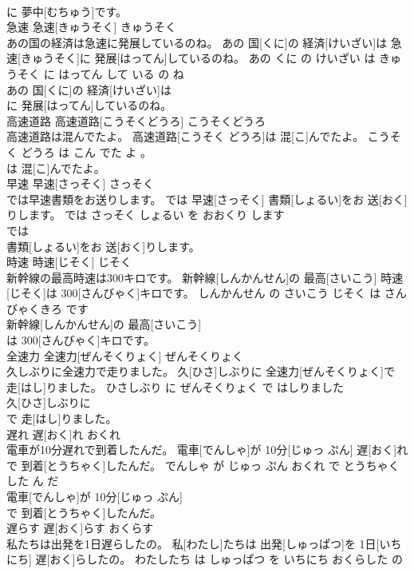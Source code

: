 \documentclass[8pt]{extreport}
\begin{document}
\begin{CJK}{UTF8}{min}
\\	に 夢中[むちゅう]です。			
\\	急速	急速[きゅうそく]	きゅうそく	
\\	あの国の経済は急速に発展しているのね。	あの 国[くに]の 経済[けいざい]は 急速[きゅうそく]に 発展[はってん]しているのね。	あの くに の けいざい は きゅうそく に はってん して いる の ね	
\\	あの 国[くに]の 経済[けいざい]は
\\	に 発展[はってん]しているのね。			
\\	高速道路	高速道路[こうそくどうろ]	こうそくどうろ	
\\	高速道路は混んでたよ。	高速道路[こうそく どうろ]は 混[こ]んでたよ。	こうそく どうろ は こん でた よ 。	
\\	は 混[こ]んでたよ。			
\\	早速	早速[さっそく]	さっそく	
\\	では早速書類をお送りします。	では 早速[さっそく] 書類[しょるい]をお 送[おく]りします。	では さっそく しょるい を おおくり します	
\\	では
\\	書類[しょるい]をお 送[おく]りします。			
\\	時速	時速[じそく]	じそく	
\\	新幹線の最高時速は300キロです。	新幹線[しんかんせん]の 最高[さいこう] 時速[じそく]は 300[さんびゃく]キロです。	しんかんせん の さいこう じそく は さんびゃくきろ です	
\\	新幹線[しんかんせん]の 最高[さいこう]
\\	は 300[さんびゃく]キロです。			
\\	全速力	全速力[ぜんそくりょく]	ぜんそくりょく	
\\	久しぶりに全速力で走りました。	久[ひさ]しぶりに 全速力[ぜんそくりょく]で 走[はし]りました。	ひさしぶり に ぜんそくりょく で はしりました	
\\	久[ひさ]しぶりに
\\	で 走[はし]りました。			
\\	遅れ	遅[おく]れ	おくれ	
\\	電車が10分遅れで到着したんだ。	電車[でんしゃ]が 10分[じゅっ ぷん] 遅[おく]れで 到着[とうちゃく]したんだ。	でんしゃ が じゅっ ぷん おくれ で とうちゃく した ん だ	
\\	電車[でんしゃ]が 10分[じゅっ ぷん]
\\	で 到着[とうちゃく]したんだ。			
\\	遅らす	遅[おく]らす	おくらす	
\\	私たちは出発を1日遅らしたの。	私[わたし]たちは 出発[しゅっぱつ]を 1日[いちにち] 遅[おく]らしたの。	わたしたち は しゅっぱつ を いちにち おくらした の	

\end{CJK}
\end{document}
